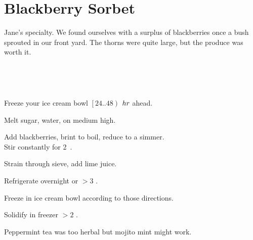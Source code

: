 \section{Blackberry Sorbet}


\begin{recipestats}[
	servings=4,
	preptime=30~\minute,
	bakingtime=15~\minute,
	inactivetime=12~\hour,
	source=Jane \& Mike,
	original=\citeauthor{sonomaSorbet}~\cite{sonomaSorbet},
]
\end{recipestats}


\begin{recipeabstract}
	Jane's specialty.
	We found ourselves with a surplus of blackberries once a bush sprouted in our front yard.
	The thorns were quite large, but the produce was worth it.
\end{recipeabstract}


\begin{ingredientcolumns}
	\begin{ingredientblock}
		\\
	\end{ingredientblock}
	\begin{ingredientblock}
		\ingredient[1~\onehalf][C]{water}\\
		\ingredient[2][\fluidounce]{lime juice}
	\end{ingredientblock}
\end{ingredientcolumns}


\begin{preparation}
\item Freeze your ice cream bowl $\left[24 .. 48\right)$ $\hour$ ahead.
\item Melt sugar,  water, on medium high.
\item Add blackberries, brint to boil, reduce to a simmer.\\
	Stir constantly for 2~\minute.
\item Strain through sieve, add lime juice.
\item Refrigerate overnight or $>3$ \hour.
\item Freeze in ice cream bowl according to those directions.
\item Solidify in freezer $>2$ \hour.
\end{preparation}


\begin{experiments}
\item Peppermint tea was too herbal but mojito mint might work.
\end{experiments}
\recipeend%
